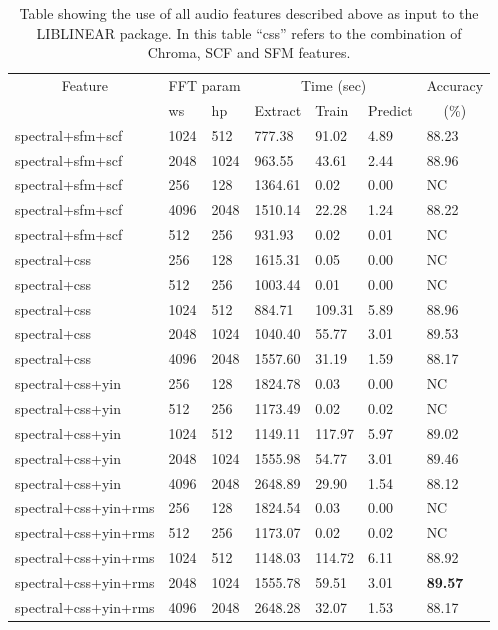 \begin{table}
\begin{tabular}{|l|l|l|l|l|l|l|}
\hline
\multicolumn{1}{|c|}{Feature} &\multicolumn{2}{c|}{FFT param} & \multicolumn{3}{c|}{Time (sec)} & Accuracy \\
\hhline{|~|-|-|-|-|-|~|}
\multicolumn{1}{|c|}{Extractor} & ws & hp & Extract & Train & Predict & \multicolumn{1}{c|}{(\%)} \\
\hhline{|=|=|=|=|=|=|=|}
spectral+sfm+scf & 1024 & 512        &   777.38  &   91.02  &   4.89  &  88.23  \\
spectral+sfm+scf & 2048 & 1024       &   963.55  &   43.61  &   2.44  &  88.96  \\
spectral+sfm+scf & 256 & 128         &  1364.61  &    0.02  &   0.00  &  NC  \\
spectral+sfm+scf & 4096 & 2048       &  1510.14  &   22.28  &   1.24  &  88.22  \\
spectral+sfm+scf & 512 & 256         &   931.93  &    0.02  &   0.01  &  NC  \\

spectral+css & 256 & 128             &  1615.31  &    0.05  &   0.00  &  NC  \\
spectral+css & 512 & 256             &  1003.44  &    0.01  &   0.00  &  NC  \\
spectral+css & 1024 & 512            &   884.71  &  109.31  &   5.89  &  88.96  \\
spectral+css & 2048 & 1024           &  1040.40  &   55.77  &   3.01  &  89.53  \\
spectral+css & 4096 & 2048           &  1557.60  &   31.19  &   1.59  &  88.17  \\
\hline
spectral+css+yin & 256 & 128         &  1824.78  &    0.03  &   0.00  &  NC  \\
spectral+css+yin & 512 & 256         &  1173.49  &    0.02  &   0.02  &  NC  \\
spectral+css+yin & 1024 & 512        &  1149.11  &  117.97  &   5.97  &  89.02  \\
spectral+css+yin & 2048 & 1024       &  1555.98  &   54.77  &   3.01  &  89.46  \\
spectral+css+yin & 4096 & 2048       &  2648.89  &   29.90  &   1.54  &  88.12  \\

spectral+css+yin+rms & 256 & 128     &  1824.54  &    0.03  &   0.00  &  NC  \\
spectral+css+yin+rms & 512 & 256     &  1173.07  &    0.02  &   0.02  &  NC  \\
spectral+css+yin+rms & 1024 & 512    &  1148.03  &  114.72  &   6.11  &  88.92  \\
spectral+css+yin+rms & 2048 & 1024   &  1555.78  &   59.51  &   3.01  &  \textbf{89.57}  \\
spectral+css+yin+rms & 4096 & 2048   &  2648.28  &   32.07  &   1.53  &  88.17  \\
\hline
\end{tabular}
\caption{Table showing the use of all audio features described above
  as input to the LIBLINEAR package.  In this table ``css'' refers to
  the combination of Chroma, SCF and SFM features. }
\label{table:obv-different-all}
\end{table}

